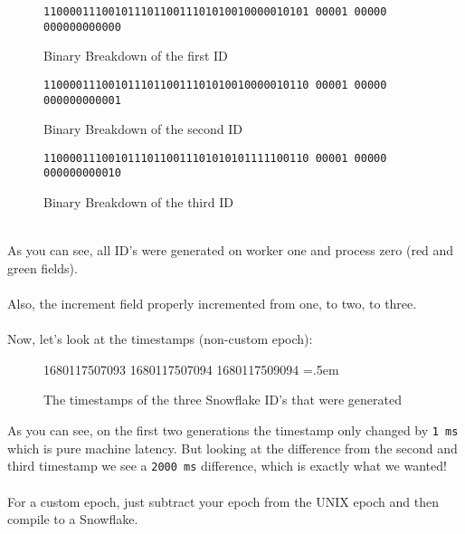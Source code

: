 \documentclass{article}
\newcommand{\code}[1]{\colorbox{cverbbg}{\texttt{#1}}}
\newcommand{\hn}[0]{\hfill \\}
\newenvironment{lcverbatim}
{\SaveVerbatim{cverb}}
{\endSaveVerbatim{}
    \flushleft\fboxrule=0pt\fboxsep=.5em
    \colorbox{cverbbg}{%

        \makebox[\dimexpr\linewidth-2\fboxsep][l]{\BUseVerbatim{cverb}}%
    }
    \endflushleft{}
}
\begin{document}
\begin{figure}[H]
    \large{\texttt{\color{cyan}11000011100101110110011101010010000010101
            \color{red}00001 \color{green}00000 \color{gray}000000000000}}
    \\
    \caption{Binary Breakdown of the first ID}\label{fig:breakdown_1}
\end{figure}

\begin{figure}[H]
    \large{\texttt{\color{cyan}11000011100101110110011101010010000010110
            \color{red}00001 \color{green}00000 \color{gray}000000000001}}
    \\
    \caption{Binary Breakdown of the second ID}\label{fig:breakdown_2}
\end{figure}

\begin{figure}[H]
    \large{\texttt{\color{cyan}11000011100101110110011101010101111100110
            \color{red}00001 \color{green}00000 \color{gray}000000000010}}
    \\
    \caption{Binary Breakdown of the third ID}\label{fig:breakdown_3}
\end{figure}

\hn{}
As you can see, all ID's were generated on worker one and process zero (red and
green fields). \\
\hn{}
Also, the increment field properly incremented from one, to two, to three.
\\
\hn{}
Now, let's look at the timestamps (non-custom epoch):

\begin{figure}[H]
    \begin{lcverbatim}
        1680117507093
        1680117507094
        1680117509094
    \end{lcverbatim}
    \caption{The timestamps of the three Snowflake ID's that were
        generated}\label{fig:breakdown_timestamps}
\end{figure}
As you can see, on the first two generations the timestamp only changed by
\code{1 ms} which is pure machine latency.
But looking at the difference from the second and third timestamp we see a
\code{2000 ms} difference, which is exactly what we wanted! \\
\hn{}
For a custom epoch, just subtract your epoch from the UNIX epoch and then
compile to a Snowflake.

\break{}
\end{document}
